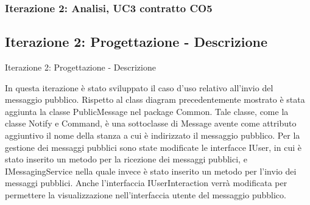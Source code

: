 \begin{frame}
 \frametitle{Iterazione 2: Analisi, UC3 contratto CO5}
  \begin{table}[!htbp]
   \caption {UC3 Contratto CO5 - publicMsg}
    \label{table_CO5}
   \end{table}
\end{frame}

\subsection{Iterazione 2: Progettazione - Descrizione}
\begin{frame} {Iterazione 2: Progettazione - Descrizione}
  \begin{scriptsize}
    In questa iterazione è stato sviluppato il caso d'uso relativo all'invio del messaggio pubblico. Rispetto al class diagram precedentemente mostrato è stata 
    aggiunta la classe PublicMessage nel package Common. Tale classe, come la classe Notify e Command, è una sottoclasse di Message avente come attributo aggiuntivo 
    il nome della stanza a cui è indirizzato il messaggio pubblico.
    Per la gestione dei messaggi pubblici sono state modificate le interfacce IUser, in cui è stato inserito un metodo per la ricezione dei messaggi pubblici, e 
    IMessagingService nella quale invece è stato inserito un metodo per l'invio dei messaggi pubblici. Anche l'interfaccia IUserInteraction verrà modificata per 
    permettere la visualizzazione nell'interfaccia utente del messaggio pubblico.
  \end{scriptsize}
\end{frame}

